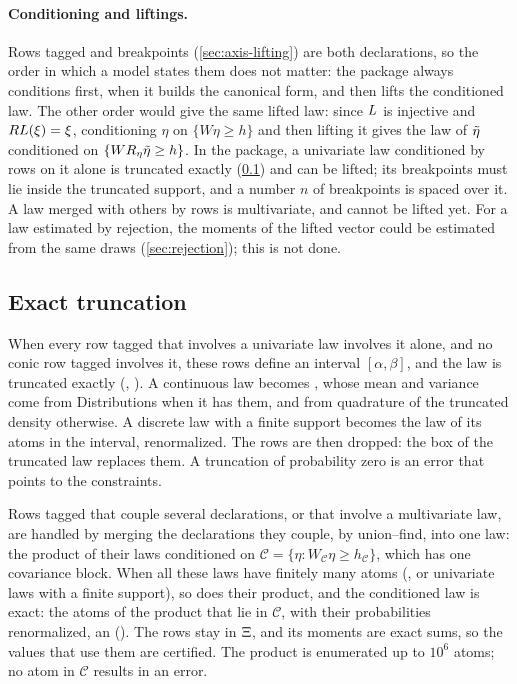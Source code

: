 \paragraph{Conditioning and liftings.}
Rows tagged  and breakpoints (\cref{sec:axis-lifting}) are both declarations, so the order in which a model states them does not matter:
the package always conditions first, when it builds the canonical form, and then lifts the conditioned law.
The other order would give the same lifted law:
since $L$ is injective and $RL(\xi) = \xi$, conditioning $\eta$ on $\{W\eta \ge h\}$ and then lifting it
gives the law of $\tilde\eta$ conditioned on $\{WR_\eta\tilde\eta \ge h\}$.
In the package, a univariate law conditioned by rows on it alone is truncated exactly (\cref{sec:exact-truncation}) and can be lifted;
its breakpoints must lie inside the truncated support, and a number $n$ of breakpoints is spaced over it.
A law merged with others by  rows is multivariate, and cannot be lifted yet.
For a law estimated by rejection, the moments of the lifted vector could be estimated from the same draws (\cref{sec:rejection});
this is not done.

\subsection{Exact truncation}
\label{sec:exact-truncation}

When every row tagged  that involves a univariate law involves it alone,
and no conic row tagged  involves it,
these rows define an interval $[\alpha, \beta]$,
and the law is truncated exactly (, ).
A continuous law becomes ,
whose mean and variance come from Distributions when it has them,
and from quadrature of the truncated density otherwise.
A discrete law with a finite support becomes the law of its atoms in the interval, renormalized.
The rows are then dropped: the box of the truncated law replaces them.
A truncation of probability zero is an error that points to the constraints.

Rows tagged  that couple several declarations, or that involve a multivariate law, are handled by merging the declarations they couple, by union--find, into one law:
the product of their laws conditioned on $\mathcal{C} = \{\eta : W_{\mathcal{C}}\eta \ge h_{\mathcal{C}}\}$, which has one covariance block.
When all these laws have finitely many atoms (, or univariate laws with a finite support), so does their product,
and the conditioned law is exact: the atoms of the product that lie in $\mathcal{C}$, with their probabilities renormalized, an  ().
The rows stay in $\Xi$, and its moments are exact sums, so the values that use them are certified.
The product is enumerated up to $10^6$ atoms; no atom in $\mathcal{C}$ results in an error.

